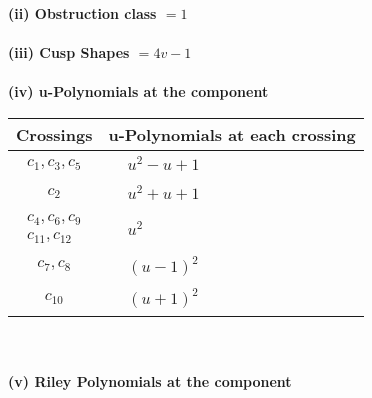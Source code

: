 \documentclass[1p]{elsarticle_modified}
\theoremstyle{definition}
\begin{document}
\flushleft \textbf{(ii) Obstruction class $= 1$}\\~\\
\flushleft \textbf{(iii) Cusp Shapes $= 4 v-1$}\\~\\
\newpage\renewcommand{\arraystretch}{1}
\flushleft \textbf{(iv) u-Polynomials at the component}\newline \\
\begin{tabular}{m{50pt}|m{274pt}}
Crossings & \hspace{64pt}u-Polynomials at each crossing \\
\hline $$\begin{aligned}c_{1},c_{3},c_{5}\end{aligned}$$&$\begin{aligned}
&u^2- u+1
\end{aligned}$\\
\hline $$\begin{aligned}c_{2}\end{aligned}$$&$\begin{aligned}
&u^2+u+1
\end{aligned}$\\
\hline $$\begin{aligned}c_{4},c_{6},c_{9}\\c_{11},c_{12}\end{aligned}$$&$\begin{aligned}
&u^2
\end{aligned}$\\
\hline $$\begin{aligned}c_{7},c_{8}\end{aligned}$$&$\begin{aligned}
&(u-1)^2
\end{aligned}$\\
\hline $$\begin{aligned}c_{10}\end{aligned}$$&$\begin{aligned}
&(u+1)^2
\end{aligned}$\\
\hline
\end{tabular}\\~\\
\newpage\renewcommand{\arraystretch}{1}
\flushleft \textbf{(v) Riley Polynomials at the component}\newline \\
\end{document}
